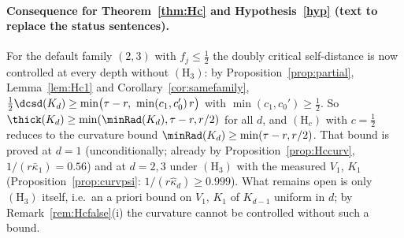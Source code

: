 \paragraph{Consequence for Theorem~\ref{thm:Hc} and Hypothesis~\ref{hyp} (text to replace the status sentences).}
For the default family $(2,3)$ with $f_j\le\frac12$ the doubly critical self-distance is now controlled at every
depth without $(\mathrm H_3)$: by Proposition~\ref{prop:partial}, Lemma~\ref{lem:Hc1} and Corollary~\ref{cor:samefamily},
$\frac12\dcsd(K_d)\ge\min\bigl(\tau-r,\ \min(c_1,c_0')\,r\bigr)$ with $\min(c_1,c_0')\ge\frac12$. So
$\thick(K_d)\ge\min(\minRad(K_d),\tau-r,r/2)$ for all $d$, and $(\mathrm H_c)$ with $c=\frac12$ reduces to the curvature
bound $\minRad(K_d)\ge\min(\tau-r,r/2)$. That bound is proved at $d=1$ (unconditionally; already by
Proposition~\ref{prop:Hccurv}, $1/(r\bar\kappa_1)=0.56$) and at $d=2,3$ under $(\mathrm H_3)$ with the measured $V_1$, $K_1$
(Proposition~\ref{prop:curvpsi}: $1/(r\hat\kappa_d)\ge0.999$). What remains open is only $(\mathrm H_3)$ itself, i.e.\ an a priori
bound on $V_1$, $K_1$ of $K_{d-1}$ uniform in $d$; by Remark~\ref{rem:Hcfalse}(i) the curvature cannot be controlled without
such a bound.
